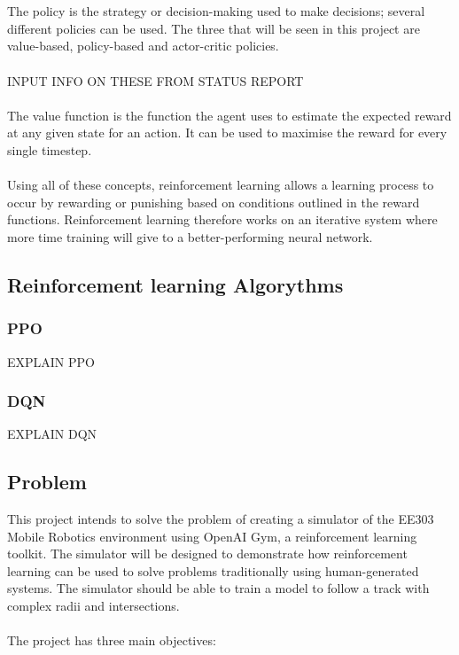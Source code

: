 \documentclass[a4paper,11pt]{article}
\begin{document}
\\\\
The policy is the strategy or decision-making used to make decisions; several different policies can be used. The three that will be seen in this project are value-based, policy-based and actor-critic policies.
\\\\
INPUT INFO ON THESE FROM STATUS REPORT
\\\\
The value function is the function the agent uses to estimate the expected reward at any given state for an action. It can be used to maximise the reward for every single timestep.
\\\\
Using all of these concepts, reinforcement learning allows a learning process to occur by rewarding or punishing based on conditions outlined in the reward functions. Reinforcement learning therefore works on an iterative system where more time training will give to a better-performing neural network.

\subsection{Reinforcement learning Algorythms}
\subsubsection{PPO}

EXPLAIN PPO

\subsubsection{DQN}

EXPLAIN DQN

\subsection{Problem}

This project intends to solve the problem of creating a simulator of the EE303 Mobile Robotics environment using OpenAI Gym, a reinforcement learning toolkit. The simulator will be designed to demonstrate how reinforcement learning can be used to solve problems traditionally using human-generated systems. The simulator should be able to train a model to follow a track with complex radii and intersections.
\\\\
The project has three main objectives:
\end{document}
